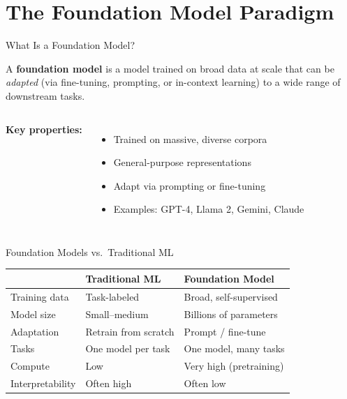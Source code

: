 \documentclass[aspectratio=169,10pt]{beamer}
\begin{document}
\section{The Foundation Model Paradigm}


\begin{frame}{What Is a Foundation Model?}
  \begin{tcolorbox}[hitbox, title=Definition (Bommasani et al.\ 2021~\cite{bommasani2021foundation})]
    A \textbf{foundation model} is a model trained on broad data at scale that can be
    \emph{adapted} (via fine-tuning, prompting, or in-context learning) to a wide range of
    downstream tasks.
  \end{tcolorbox}
  \vspace{0.4em}
  \begin{columns}[T]
      \textbf{Key properties:}
      \begin{itemize}
        \item Trained on massive, diverse corpora
        \item General-purpose representations
        \item Adapt via prompting or fine-tuning
        \item Examples: GPT-4, Llama 2, Gemini, Claude
      \end{itemize}
  \end{columns}
\end{frame}

\begin{frame}{Foundation Models vs.\ Traditional ML}
  \begin{center}
  \begin{tabular}{lll}
    \toprule
    & \textbf{Traditional ML} & \textbf{Foundation Model} \\
    \midrule
    Training data & Task-labeled & Broad, self-supervised \\
    Model size & Small–medium & Billions of parameters \\
    Adaptation & Retrain from scratch & Prompt / fine-tune \\
    Tasks & One model per task & One model, many tasks \\
    Compute & Low & Very high (pretraining) \\
    Interpretability & Often high & Often low \\
    \bottomrule
  \end{tabular}
  \end{center}
\end{frame}
\end{document}
